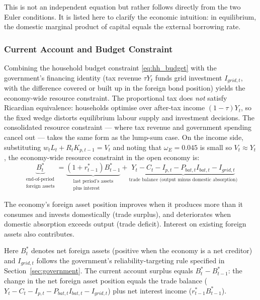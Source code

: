 \documentclass[12pt, a4paper]{article}
\begin{document}
\noindent This is not an independent equation but rather follows directly from the two Euler conditions. It is listed here to clarify the economic intuition: in equilibrium, the domestic marginal product of capital equals the external borrowing rate.

\subsubsection{Current Account and Budget Constraint}

Combining the household budget constraint \eqref{eq:hh_budget} with the government's financing identity (tax revenue $\tau Y_t$ funds grid investment $I_{grid,t}$, with the difference covered or built up in the foreign bond position) yields the economy-wide resource constraint. The proportional tax does \textit{not} satisfy Ricardian equivalence: households optimise over after-tax income $(1-\tau)Y_t$, so the fixed wedge distorts equilibrium labour supply and investment decisions. The consolidated resource constraint --- where tax revenue and government spending cancel out --- takes the same form as the lump-sum case. On the income side, substituting $w_t L_t + R_t K_{p,t-1} = V_t$ and noting that $\omega_E = 0.045$ is small so $V_t \approx Y_t$, the economy-wide resource constraint in the open economy is:
\begin{equation}
\underbrace{B^*_t}_{\substack{\text{end-of-period}\\\text{foreign assets}}} = \underbrace{(1 + r^*_{t-1}) B^*_{t-1}}_{\substack{\text{last period's assets}\\\text{plus interest}}} + \underbrace{Y_t - C_t - I_{p,t} - P_{bat,t} I_{bat,t} - I_{grid,t}}_{\text{trade balance (output minus domestic absorption)}}
\label{eq:current_account}
\end{equation}

The economy's foreign asset position improves when it produces more than it consumes and invests domestically (trade surplus), and deteriorates when domestic absorption exceeds output (trade deficit). Interest on existing foreign assets also contributes.

Here $B^*_t$ denotes net foreign assets (positive when the economy is a net creditor) and $I_{grid,t}$ follows the government's reliability-targeting rule specified in Section~\ref{sec:government}. The current account surplus equals $B^*_t - B^*_{t-1}$: the change in the net foreign asset position equals the trade balance ($Y_t - C_t - I_{p,t} - P_{bat,t} I_{bat,t} - I_{grid,t}$) plus net interest income ($r^*_{t-1} B^*_{t-1}$).
\end{document}

